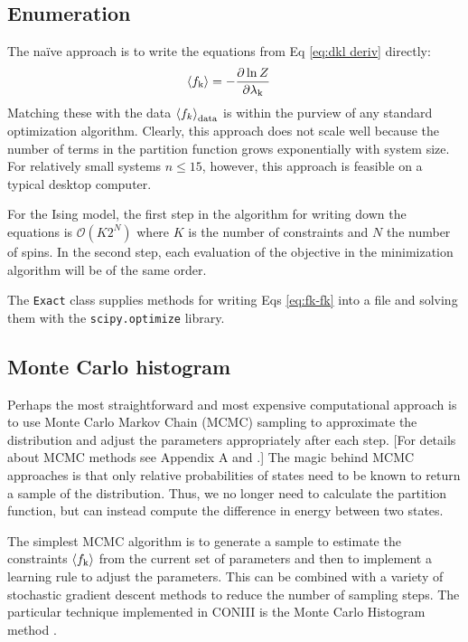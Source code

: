\documentclass[aps,prl,twocolumn]{revtex4-1}
\begin{document}
\subsection{Enumeration}
The na\"{i}ve approach is to write the equations from Eq \ref{eq:dkl deriv} directly:
\begin{align}
	\left<f_{\rm k}\right> &= -\frac{\partial \ln Z}{\partial \lambda_{\rm k}}
\end{align}
Matching these with the data $\left<f_k\right>_{\rm data}$ is within the purview of any standard optimization algorithm. Clearly, this approach does not scale well because the number of terms in the partition function grows exponentially with system size. For relatively small systems $n\leq15$, however, this approach is feasible on a typical desktop computer.

For the Ising model, the first step in the algorithm for writing down the equations is $\mathcal{O}(K 2^{N})$ where $K$ is the number of constraints and $N$ the number of spins. In the second step, each evaluation of the objective in the minimization algorithm will be of the same order.

The {\tt Exact} class supplies methods for writing Eqs \ref{eq:fk-fk} into a file and solving them with the {\tt scipy.optimize} library.


\subsection{Monte Carlo histogram}
Perhaps the most straightforward and most expensive computational approach is to use Monte Carlo Markov Chain (MCMC) sampling to approximate the distribution and adjust the parameters appropriately after each step. [For details about MCMC methods see Appendix A and \cite{MacKay:2005wc}.] The magic behind MCMC approaches is that only relative probabilities of states need to be known to return a sample of the distribution. Thus, we no longer need to calculate the partition function, but can instead compute the difference in energy between two states.

The simplest MCMC algorithm is to generate a sample to estimate the constraints $\left<f_{\rm k}\right>$ from the current set of parameters and then to implement a learning rule to adjust the parameters. This can be combined with a variety of stochastic gradient descent methods to reduce the number of sampling steps. The particular technique implemented in CONIII is the Monte Carlo Histogram method \cite{Broderick:2007wq}.
\end{document}
